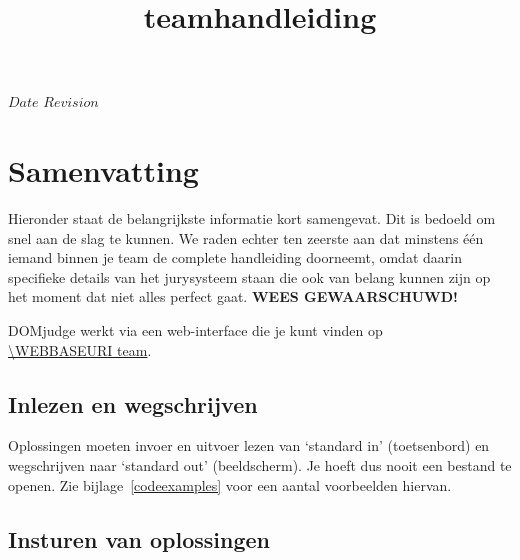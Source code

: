 

\usepackage[dutch]{babel}

\renewcommand{\versionrevison}{Versie/revisie}
\renewcommand{\lastmodified}{Laatst gewijzigd}
\renewcommand{\generated}{Gegenereerd}

\SVN $Date$
\SVN $Revision$

\title{\DOMjudge teamhandleiding}




\titlestuff{\DOMJUDGEVERSION}{\SVNRevision}{\SVNDate}{\today}

\section*{Samenvatting}

Hieronder staat de belangrijkste informatie kort samengevat. Dit is
bedoeld om snel aan de slag te kunnen. We raden echter ten zeerste
aan dat minstens \'e\'en iemand binnen je team de complete handleiding
doorneemt, omdat daarin specifieke details van het jurysysteem staan
die ook van belang kunnen zijn op het moment dat niet alles perfect
gaat. \textbf{WEES GEWAARSCHUWD!}

DOMjudge werkt via een web-interface die je kunt vinden op \\
\url{\WEBBASEURI team}.

\subsection*{Inlezen en wegschrijven}

Oplossingen moeten invoer en uitvoer lezen van `standard in'
(toetsenbord) en wegschrijven naar `standard out' (beeldscherm). Je
hoeft dus nooit een bestand te openen. Zie bijlage~\ref{codeexamples}
voor een aantal voorbeelden hiervan.

\subsection*{Insturen van oplossingen}

